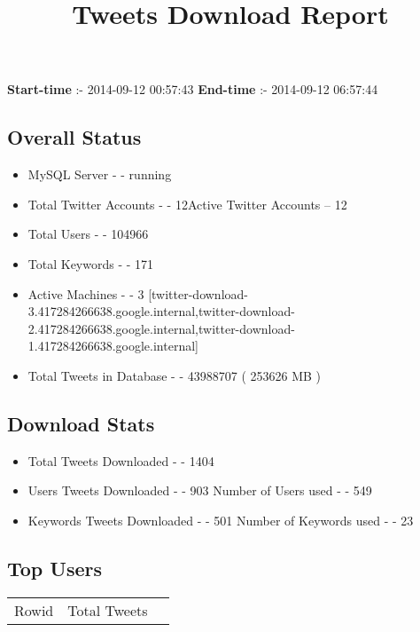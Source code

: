 \documentclass{article}\usepackage[T1]{fontenc}
\begin{document}
\title{\textbf{Tweets Download Report}}
               \date{}
                \maketitle
               \centerline{\textbf{Start-time} :- 2014-09-12 00:57:43 \hspace{40pt} \textbf{End-time} :- 2014-09-12 06:57:44}               \subsection*{Overall Status}                \begin{itemize}                \item MySQL Server - - running               \item Total Twitter Accounts - - 12\newline Active Twitter Accounts -- 12               \item Total Users - - 104966               \item Total Keywords - - 171               \item Active Machines - - 3 [twitter-download-3.417284266638.google.internal,twitter-download-2.417284266638.google.internal,twitter-download-1.417284266638.google.internal]               \item Total Tweets in Database - - 43988707 ( 253626 MB )               \end{itemize}               \subsection*{Download Stats}                \begin{itemize}                \item Total Tweets Downloaded - - 1404               \item Users Tweets Downloaded - - 903 \newline Number of Users used - - 549               \item Keywords Tweets Downloaded - - 501 \newline Number of Keywords used - - 23              \end{itemize}              \subsection*{Top Users}\begin{tabular}{|c|c|c|}         \hline         Rowid & Total Tweets \\ 

\end{tabular}
\end{document}
